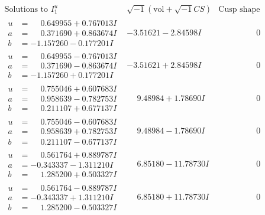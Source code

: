 \documentclass[1p]{elsarticle_modified}
\theoremstyle{definition}
\newcommand{\I}{\sqrt{-1}}
\begin{document}
$$\begin{array}{c|c|c}  
\text{Solutions to }I^u_{1}& \I (\text{vol} + \sqrt{-1}CS) & \text{Cusp shape}\\
 \hline 
\begin{aligned}
u &= \phantom{-}0.649955 + 0.767013 I \\
a &= \phantom{-}0.371690 + 0.863674 I \\
b &= -1.157260 - 0.177201 I\end{aligned}
 & -3.51621 - 2.84598 I & \phantom{-0.000000 } 0 \\ \hline\begin{aligned}
u &= \phantom{-}0.649955 - 0.767013 I \\
a &= \phantom{-}0.371690 - 0.863674 I \\
b &= -1.157260 + 0.177201 I\end{aligned}
 & -3.51621 + 2.84598 I & \phantom{-0.000000 } 0 \\ \hline\begin{aligned}
u &= \phantom{-}0.755046 + 0.607683 I \\
a &= \phantom{-}0.958639 - 0.782753 I \\
b &= \phantom{-}0.211107 + 0.677137 I\end{aligned}
 & \phantom{-}9.48984 + 1.78690 I & \phantom{-0.000000 } 0 \\ \hline\begin{aligned}
u &= \phantom{-}0.755046 - 0.607683 I \\
a &= \phantom{-}0.958639 + 0.782753 I \\
b &= \phantom{-}0.211107 - 0.677137 I\end{aligned}
 & \phantom{-}9.48984 - 1.78690 I & \phantom{-0.000000 } 0 \\ \hline\begin{aligned}
u &= \phantom{-}0.561764 + 0.889787 I \\
a &= -0.343337 - 1.311210 I \\
b &= \phantom{-}1.285200 + 0.503327 I\end{aligned}
 & \phantom{-}6.85180 - 11.78730 I & \phantom{-0.000000 } 0 \\ \hline\begin{aligned}
u &= \phantom{-}0.561764 - 0.889787 I \\
a &= -0.343337 + 1.311210 I \\
b &= \phantom{-}1.285200 - 0.503327 I\end{aligned}
 & \phantom{-}6.85180 + 11.78730 I & \phantom{-0.000000 } 0 \\ \hline\begin{aligned}

\end{aligned}
\end{array}$$
\end{document}
